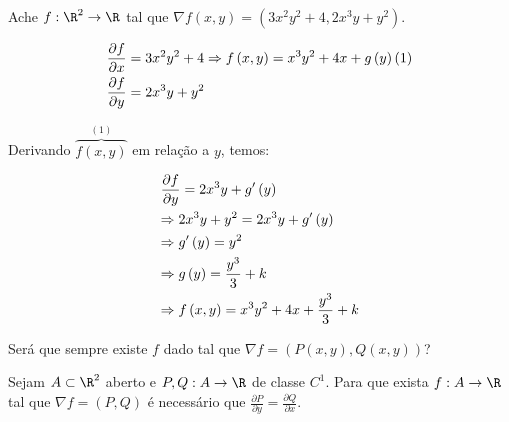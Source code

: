 \documentclass{book}
\begin{document}
\begin{ex}
    Ache $f:\R^2 \to \R$ tal que $\nabla f\left( {x,y} \right) = \left( {3x^2 y^2  + 4,2x^3 y + y^2 } \right)$.
\end{ex}

\begin{sol}
\[
\begin{gathered}
\frac{{\partial f}}
{{\partial x}} = 3x^2 y^2  + 4 \Rightarrow f\left( {x,y} \right) = x^3 y^2  + 4x + g\left( y \right)\left( 1 \right) \hfill \\
\frac{{\partial f}}
{{\partial y}} = 2x^3 y + y^2  \hfill \\
\end{gathered}
\]

    Derivando $\overbrace {f\left( {x,y} \right)}^{\left( 1 \right)}$ em rela\c c\~ao a $y$, temos:

\[
\begin{gathered}
\frac{{\partial f}}
{{\partial y}} = 2x^3 y + g'\left( y \right) \hfill \\
\Rightarrow 2x^3 y + y^2  = 2x^3 y + g'\left( y \right) \hfill \\
\Rightarrow g'\left( y \right) = y^2  \hfill \\
\Rightarrow g\left( y \right) = \frac{{y^3 }}
{3} + k \hfill \\
\Rightarrow f\left( {x,y} \right) = x^3 y^2  + 4x + \frac{{y^3 }}
{3} + k \hfill \\
\end{gathered}
\]

\end{sol}

Ser\'a que sempre existe $f$ dado tal que $\nabla f = \left( {P\left( {x,y} \right),Q\left( {x,y} \right)} \right)$?

\begin{prop}
    Sejam $A \subset \R^2$ aberto e $P,Q:A \to \R$ de classe $C^1$. Para que exista $f:A \to \R$ tal que $\nabla f = \left( {P,Q} \right)$ \'e necess\'ario que $\frac{{\partial P}}{{\partial y}} = \frac{{\partial Q}}{{\partial x}}$.
\end{prop}
\end{document}
